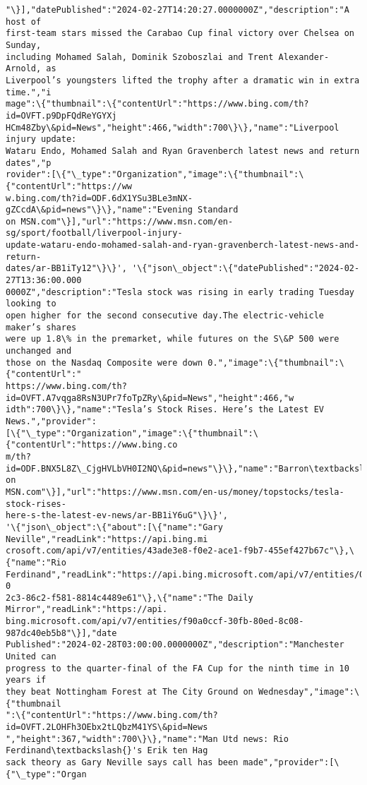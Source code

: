 \documentclass[11pt]{article}
\begin{document}
\begin{Verbatim}[commandchars=\\\{\}]
"\}],"datePublished":"2024-02-27T14:20:27.0000000Z","description":"A host of
first-team stars missed the Carabao Cup final victory over Chelsea on Sunday,
including Mohamed Salah, Dominik Szoboszlai and Trent Alexander-Arnold, as
Liverpool’s youngsters lifted the trophy after a dramatic win in extra time.","i
mage":\{"thumbnail":\{"contentUrl":"https://www.bing.com/th?id=OVFT.p9DpFQdReYGYXj
HCm48Zby\&pid=News","height":466,"width":700\}\},"name":"Liverpool injury update:
Wataru Endo, Mohamed Salah and Ryan Gravenberch latest news and return dates","p
rovider":[\{"\_type":"Organization","image":\{"thumbnail":\{"contentUrl":"https://ww
w.bing.com/th?id=ODF.6dX1YSu3BLe3mNX-gZCcdA\&pid=news"\}\},"name":"Evening Standard
on MSN.com"\}],"url":"https://www.msn.com/en-sg/sport/football/liverpool-injury-
update-wataru-endo-mohamed-salah-and-ryan-gravenberch-latest-news-and-return-
dates/ar-BB1iTy12"\}\}', '\{"json\_object":\{"datePublished":"2024-02-27T13:36:00.000
0000Z","description":"Tesla stock was rising in early trading Tuesday looking to
open higher for the second consecutive day.The electric-vehicle maker’s shares
were up 1.8\% in the premarket, while futures on the S\&P 500 were unchanged and
those on the Nasdaq Composite were down 0.","image":\{"thumbnail":\{"contentUrl":"
https://www.bing.com/th?id=OVFT.A7vqga8RsN3UPr7foTpZRy\&pid=News","height":466,"w
idth":700\}\},"name":"Tesla’s Stock Rises. Here’s the Latest EV News.","provider":
[\{"\_type":"Organization","image":\{"thumbnail":\{"contentUrl":"https://www.bing.co
m/th?id=ODF.BNX5L8Z\_CjgHVLbVH0I2NQ\&pid=news"\}\},"name":"Barron\textbackslash{}'s on
MSN.com"\}],"url":"https://www.msn.com/en-us/money/topstocks/tesla-stock-rises-
here-s-the-latest-ev-news/ar-BB1iY6uG"\}\}',
'\{"json\_object":\{"about":[\{"name":"Gary Neville","readLink":"https://api.bing.mi
crosoft.com/api/v7/entities/43ade3e8-f0e2-ace1-f9b7-455ef427b67c"\},\{"name":"Rio 
Ferdinand","readLink":"https://api.bing.microsoft.com/api/v7/entities/05a2d7ee-0
2c3-86c2-f581-8814c4489e61"\},\{"name":"The Daily Mirror","readLink":"https://api.
bing.microsoft.com/api/v7/entities/f90a0ccf-30fb-80ed-8c08-987dc40eb5b8"\}],"date
Published":"2024-02-28T03:00:00.0000000Z","description":"Manchester United can
progress to the quarter-final of the FA Cup for the ninth time in 10 years if
they beat Nottingham Forest at The City Ground on Wednesday","image":\{"thumbnail
":\{"contentUrl":"https://www.bing.com/th?id=OVFT.2LOHFh3OEbx2tLQbzM41YS\&pid=News
","height":367,"width":700\}\},"name":"Man Utd news: Rio Ferdinand\textbackslash{}'s Erik ten Hag
sack theory as Gary Neville says call has been made","provider":[\{"\_type":"Organ

\end{Verbatim}
\end{document}
